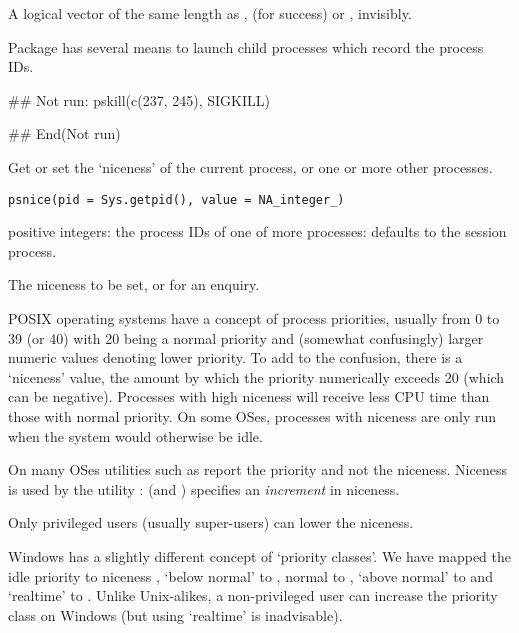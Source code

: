 %
\begin{Value}
A logical vector of the same length as ,
 (for success) or , invisibly.
\end{Value}
%
\begin{SeeAlso}\relax
Package  has several means to launch child processes
which record the process IDs.

\end{SeeAlso}
%
\begin{Examples}
\begin{ExampleCode}
## Not run: 
pskill(c(237, 245), SIGKILL)

## End(Not run)
\end{ExampleCode}
\end{Examples}
%
\begin{Description}\relax
Get or set the `niceness' of the current process, or one or
more other processes.
\end{Description}
%
\begin{Usage}
\begin{verbatim}
psnice(pid = Sys.getpid(), value = NA_integer_)
\end{verbatim}
\end{Usage}
%
\begin{Arguments}
\begin{ldescription}
\item[\code{pid}] positive integers: the process IDs of one of more
processes: defaults to the \R{} session process.
\item[\code{value}] The niceness to be set, or  for an enquiry.
\end{ldescription}
\end{Arguments}
%
\begin{Details}\relax
POSIX operating systems have a concept of process priorities, usually
from 0 to 39 (or 40) with 20 being a normal priority and (somewhat
confusingly) larger numeric values denoting lower priority.  To add to
the confusion, there is a `niceness' value, the amount by which
the priority numerically exceeds 20 (which can be negative).
Processes with high niceness will receive less CPU time than those
with normal priority.  On some OSes, processes with niceness
 are only run when the system would otherwise be idle.

On many OSes utilities such as  report the priority and
not the niceness.  Niceness is used by the utility
:  (and
) specifies an \emph{increment} in niceness.

Only privileged users (usually super-users) can lower the niceness.

Windows has a slightly different concept of `priority
classes'.  We have mapped the idle priority to niceness ,
`below normal' to , normal to , `above
normal' to  and `realtime' to .  Unlike
Unix-alikes, a non-privileged user can increase the priority class on
Windows (but using `realtime' is inadvisable).
\end{Details}
